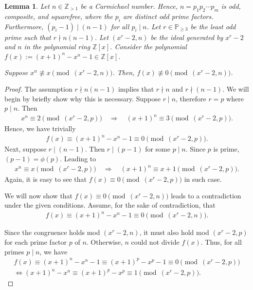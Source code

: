 \documentclass{article}
\theoremstyle{plain}
\newtheorem{lemma}[theorem]{Lemma}
\theoremstyle{definition}
\newcommand{\Z}{\mathbb{Z}}
\begin{document}
\begin{lemma} \label{proof:carmichaelnumbersfail}
Let $n \in \Z_{>1}$ be a Carmichael number. Hence, $n = p_1 p_2 \cdots p_m$ is odd, composite, and squarefree, where the $p_i$ are distinct odd prime factors. Furthermore, $(p_i-1) \mid (n-1)$ for all $p_i \mid n$. Let $r \in \mathbb{P}_{\geq 3}$ be the least odd prime such that $r \nmid n (n-1)$. Let $(x^r-2, n)$ be the ideal generated by $x^r-2$ and $n$ in the polynomial ring $\Z[x]$. Consider the polynomial $f(x) := (x+1)^n - x^n - 1 \in \Z[x]$.

Suppose $x^n \not\equiv x \pmod{(x^r-2,n)}$. Then, $f(x) \not\equiv 0 \pmod{(x^r-2, n)}$.
\end{lemma}
\begin{proof}
The assumption $r \nmid n (n-1)$ implies that $r \nmid n$ and $r \nmid (n-1)$. We will begin by briefly show why this is necessary. Suppose $r \mid n$, therefore $r = p$ where $p \mid n$. Then
\begin{align*}
    x^n \equiv 2 \pmod{(x^r-2, p)}
    \quad \Longrightarrow \quad
    (x+1)^n \equiv 3 \pmod{(x^r-2, p)} .
\end{align*}
Hence, we have trivially
\begin{align*}
    f(x) \equiv (x+1)^n - x^n - 1 \equiv 0 \pmod{(x^r-2, p)} .
\end{align*}
Next, suppose $r \mid (n-1)$. Then $r \mid (p-1)$ for some $p \mid n$. Since $p$ is prime, $(p-1) = \phi(p)$. Leading to
\begin{align*}
    x^n \equiv x \pmod{(x^r-2, p)}
    \quad \Longrightarrow \quad
    (x+1)^n \equiv x+1 \pmod{(x^r-2, p)} .
\end{align*}
Again, it is easy to see that $f(x) \equiv 0 \pmod{(x^r-2, p)}$ in such case.

We will now show that $f(x) \equiv 0 \pmod{(x^r-2, n)}$ leads to a contradiction under the given conditions. Assume, for the sake of contradiction, that
\begin{align*}
    f(x) \equiv (x+1)^n - x^n - 1 \equiv 0 \pmod{(x^r-2, n)} .
\end{align*}

Since the congruence holds mod $(x^r-2, n)$, it must also hold mod $(x^r-2, p)$ for each prime factor $p$ of $n$. Otherwise, $n$ could not divide $f(x)$. Thus, for all primes $p \mid n$, we have
\begin{align*}
f(x) \equiv (x+1)^n - x^n - 1 \equiv (x+1)^p - x^p - 1 \equiv 0 \pmod{(x^r-2, p)} \\
\Longleftrightarrow (x+1)^n - x^n \equiv (x+1)^p - x^p \equiv 1 \pmod{(x^r-2, p)} .
\end{align*}


\end{proof}
\end{document}
